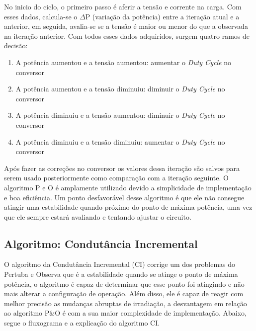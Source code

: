 No inicio do ciclo, o primeiro passo é aferir a tensão e corrente na carga. Com esses dados, calcula-se o $\Delta$P (variação da potência) entre a iteração atual e a anterior, em seguida, avalia-se se a tensão é maior ou menor do que a observada na iteração anterior. Com todos esses dados adquiridos, surgem quatro ramos de decisão:
\begin{enumerate}
    \item A potência aumentou e a tensão aumentou: aumentar o \textit{Duty Cycle} no conversor 
    \item A potência aumentou e a tensão diminuiu: diminuir o \textit{Duty Cycle} no conversor
    \item A potência diminuiu e a tensão aumentou: diminuir o \textit{Duty Cycle} no conversor
    \item A potência diminuiu e a tensão diminuiu: aumentar o \textit{Duty Cycle} no conversor
\end{enumerate}

Após fazer as correções no conversor os valores dessa iteração são salvos para serem usado posteriormente como comparação com a iteração seguinte. O algoritmo P e O é amplamente utilizado devido a simplicidade de implementação e boa eficiência. Um ponto desfavorável desse algoritmo é que ele não consegue atingir uma estabilidade quando próximo do ponto de máxima potência, uma vez que ele sempre estará avaliando e tentando ajustar o circuito.

\subsection*{Algoritmo: Condutância Incremental}

O algoritmo da Condutância Incremental (CI) corrige um dos problemas do Pertuba e Observa que é a estabilidade quando se atinge o ponto de máxima potência, o algoritmo é capaz de determinar que esse ponto foi atingindo e não mais alterar a configuração de operação. Além disso, ele é capaz de reagir com melhor precisão as mudanças abruptas de irradiação, a desvantagem em relação ao algoritmo P\&O é com a sua maior complexidade de implementação. Abaixo, segue o fluxograma e a explicação do algoritmo CI.

